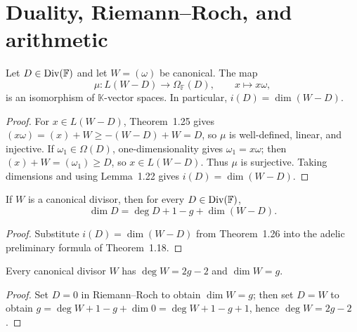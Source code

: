 \chapter{Duality, Riemann--Roch, and arithmetic}
\label{par-chap-rr-arithmetic}

\begin{theorem}
\label{par-thm-duality}
\uses{}
Let $D\in\operatorname{Div}(\mathbb F)$ and let $W=(\omega)$ be canonical. The map
\[
\mu:L(W-D)\longrightarrow\Omega_{\mathbb F}(D),\qquad x\longmapsto x\omega,
\]
is an isomorphism of $\mathbb K$-vector spaces. In particular,
$i(D)=\dim(W-D)$.
\end{theorem}
\begin{proof}
For $x\in L(W-D)$, Theorem~1.25 gives
$(x\omega)=(x)+W\geq-(W-D)+W=D$, so $\mu$ is well-defined, linear, and
injective. If $\omega_1\in\Omega(D)$,
one-dimensionality gives
$\omega_1=x\omega$; then $(x)+W=(\omega_1)\geq D$, so
$x\in L(W-D)$. Thus $\mu$ is surjective. Taking dimensions and using
Lemma~1.22 gives $i(D)=\dim(W-D)$.
\end{proof}

\begin{theorem}
\label{par-thm-riemann-roch}
\uses{}
If $W$ is a canonical divisor, then for every $D\in\operatorname{Div}(\mathbb F)$,
\[
\dim D=\deg D+1-g+\dim(W-D).
\]
\end{theorem}
\begin{proof}
Substitute $i(D)=\dim(W-D)$ from Theorem~1.26 into the adelic preliminary
formula of Theorem~1.18.
\end{proof}

\begin{corollary}
\label{par-cor-canonical-degree}
\uses{}
Every canonical divisor $W$ has $\deg W=2g-2$ and $\dim W=g$.
\end{corollary}
\begin{proof}
Set $D=0$ in Riemann--Roch to obtain $\dim W=g$; then set $D=W$ to obtain
$g=\deg W+1-g+\dim0=\deg W+1-g+1$, hence $\deg W=2g-2$.
\end{proof}

